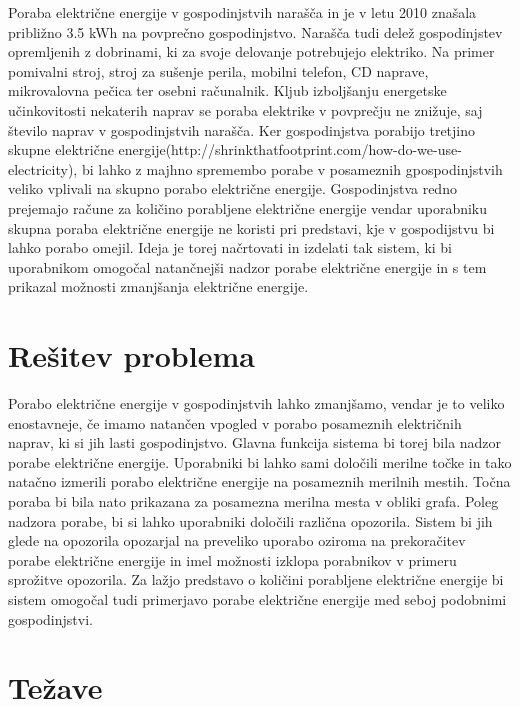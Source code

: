 \documentclass[12pt,a4paper,titlepage,openany]{report}
\begin{document}
Poraba električne energije v gospodinjstvih narašča in je v letu 2010 znašala približno 3.5 kWh na povprečno gospodinjstvo. Narašča tudi delež gospodinjstev opremljenih z dobrinami, ki za svoje delovanje potrebujejo elektriko. Na primer pomivalni stroj, stroj za sušenje perila, mobilni telefon, CD naprave, mikrovalovna pečica ter osebni računalnik. Kljub izboljšanju energetske učinkovitosti nekaterih naprav se poraba elektrike v povprečju ne znižuje, saj število naprav v gospodinjstvih narašča. Ker gospodinjstva porabijo tretjino skupne električne energije(http://shrinkthatfootprint.com/how-do-we-use-electricity), bi lahko z majhno spremembo porabe v posameznih gpospodinjstvih veliko vplivali na skupno porabo električne energije. Gospodinjstva redno prejemajo račune za količino porabljene električne energije vendar uporabniku skupna poraba električne energije ne koristi pri predstavi, kje v gospodijstvu bi lahko porabo omejil. Ideja je torej načrtovati in izdelati tak sistem, ki bi uporabnikom omogočal natančnejši nadzor porabe električne energije in s tem prikazal možnosti zmanjšanja električne energije.

\chapter{Rešitev problema}
\thispagestyle{fancy}

Porabo električne energije v gospodinjstvih lahko zmanjšamo, vendar je to veliko enostavneje, če imamo natančen vpogled v porabo posameznih električnih naprav, ki si jih lasti gospodinjstvo. Glavna funkcija sistema bi torej bila nadzor porabe električne energije. Uporabniki bi lahko sami določili merilne točke in tako natačno izmerili porabo električne energije na posameznih merilnih mestih. Točna poraba bi bila nato prikazana za posamezna merilna mesta v obliki grafa. Poleg nadzora porabe, bi si lahko uporabniki določili različna opozorila. Sistem bi jih glede na opozorila opozarjal na preveliko uporabo oziroma na prekoračitev porabe električne energije in imel možnosti izklopa porabnikov v primeru sprožitve opozorila. Za lažjo predstavo o količini porabljene električne energije bi sistem omogočal tudi primerjavo porabe električne energije med seboj podobnimi gospodinjstvi.

\chapter{Težave}
\thispagestyle{fancy}
\end{document}
